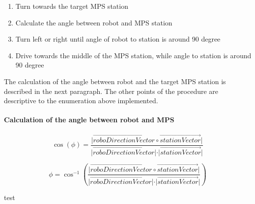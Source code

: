 \begin{enumerate}
\item Turn towards the target MPS station
\item Calculate the angle between robot and MPS station
\item Turn left or right until angle of robot to station is around 90 degree
\item Drive towards the middle of the MPS station, while angle to station is around 90 degree
\end{enumerate}

The calculation of the angle between robot and the target MPS station is described in the next paragraph. The other points of the procedure are descriptive to the enumeration above implemented.

\paragraph{Calculation of the angle between robot and MPS}

\begin{equation}
\cos(\phi) = \frac{ \vert \overrightarrow{roboDirectionVector} \circ \overrightarrow{stationVector} \vert} { \vert \overrightarrow{roboDirectionVector}  \vert  \cdot \vert \overrightarrow{stationVector}  \vert}
\end{equation}

\begin{equation}
\phi = \cos ^{ - 1} \left( \frac{ \vert \overrightarrow{roboDirectionVector} \circ \overrightarrow{stationVector} \vert} { \vert \overrightarrow{roboDirectionVector}  \vert  \cdot \vert \overrightarrow{stationVector}  \vert} \right)
\end{equation}

test



